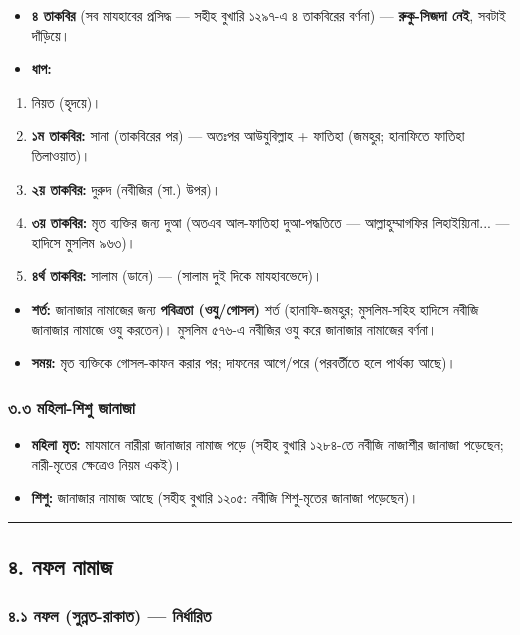 \begin{itemize}
\item \textbf{৪ তাকবির} (সব মাযহাবের প্রসিদ্ধ — সহীহ বুখারি ১২৯৭-এ ৪ তাকবিরের বর্ণনা) — \textbf{রুকু-সিজদা নেই}, সবটাই দাঁড়িয়ে।
\item \textbf{ধাপ:}
\end{itemize}
\begin{enumerate}
\item নিয়ত (হৃদয়ে)।
\item \textbf{১ম তাকবির:} সানা (তাকবিরের পর) — অতঃপর আউযুবিল্লাহ + ফাতিহা (জমহুর; হানাফিতে ফাতিহা তিলাওয়াত)।
\item \textbf{২য় তাকবির:} দুরুদ (নবীজির (সা.) উপর)।
\item \textbf{৩য় তাকবির:} মৃত ব্যক্তির জন্য দুআ (অতএব আল-ফাতিহা দুআ-পদ্ধতিতে — আল্লাহুম্মাগফির লিহাইয়্যিনা... — হাদিসে মুসলিম ৯৬৩)।
\item \textbf{৪র্থ তাকবির:} সালাম (ডানে) — (সালাম দুই দিকে মাযহাবভেদে)।
\end{enumerate}
\begin{itemize}
\item \textbf{শর্ত:} জানাজার নামাজের জন্য \textbf{পবিত্রতা (ওযু/গোসল)} শর্ত (হানাফি-জমহুর; মুসলিম-সহিহ হাদিসে নবীজি জানাজার নামাজে ওযু করতেন)। মুসলিম ৫৭৬-এ নবীজির ওযু করে জানাজার নামাজের বর্ণনা।
\item \textbf{সময়:} মৃত ব্যক্তিকে গোসল-কাফন করার পর; দাফনের আগে/পরে (পরবর্তীতে হলে পার্থক্য আছে)।
\end{itemize}
\subsubsection*{৩.৩ মহিলা-শিশু জানাজা}

\begin{itemize}
\item \textbf{মহিলা মৃত:} মাযমানে নারীরা জানাজার নামাজ পড়ে (সহীহ বুখারি ১২৮৪-তে নবীজি নাজাশীর জানাজা পড়েছেন; নারী-মৃতের ক্ষেত্রেও নিয়ম একই)।
\item \textbf{শিশু:} জানাজার নামাজ আছে (সহীহ বুখারি ১২০৫: নবীজি শিশু-মৃতের জানাজা পড়েছেন)।
\end{itemize}
\medskip\hrule\medskip

\subsection*{৪. নফল নামাজ}

\subsubsection*{৪.১ নফল (সুন্নত-রাকাত) — নির্ধারিত}

